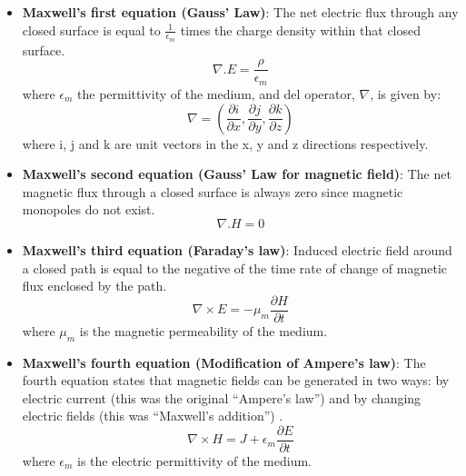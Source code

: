 \documentclass[../report.tex]{subfiles}
\begin{document}
\begin{itemize}	
	\item \textbf{Maxwell's first equation (Gauss' Law)}: The net electric flux through any closed surface is equal to $\frac{1}{\epsilon_m}$ times the charge density within that closed surface.
	\begin{equation}\label{eq:max1_1}
	\nabla.E = \frac{\rho}{\epsilon_m}	
	\end{equation}
	where $\epsilon_m$ the permittivity of the medium, and del operator, $\nabla$, is given by:
	\begin{equation}\label{eq:max1_2}
	\nabla = \left(\frac{\partial i}{\partial x},\frac{\partial j}{\partial y},\frac{\partial k}{\partial z}\right)
	\end{equation}
	where i, j and k are unit vectors in the x, y and z directions respectively.
	
	\item \textbf{Maxwell's second equation (Gauss' Law for magnetic field)}: The net magnetic flux through a closed surface is always zero since magnetic monopoles do not exist.
	\begin{equation}\label{eq:max1_3}
	\nabla.H = 0	
	\end{equation}
	
	\item \textbf{Maxwell's third equation (Faraday's law)}: Induced electric field around a closed path is equal to the negative of the time rate of change of magnetic flux enclosed by the path.
	\begin{equation}\label{eq:max1_4}
	\nabla\times E = -\mu_m\frac{\partial H}{\partial t}
	\end{equation}
	where $\mu_m$ is the magnetic permeability of the medium.

	\item \textbf{Maxwell's fourth equation (Modification of Ampere's law)}:  The fourth equation states that magnetic fields can be generated in two ways: by electric current (this was the original “Ampere's law”) and by changing electric fields (this was “Maxwell's addition”) \cite{wiki_maxwells_2016}.
	\begin{equation}\label{eq:max1_5}
	\nabla\times H =  J + \epsilon_m\frac{\partial E}{\partial t}	
	\end{equation}
	where $\epsilon_m$ is the electric permittivity of the medium.	
\end{itemize}
\end{document}
